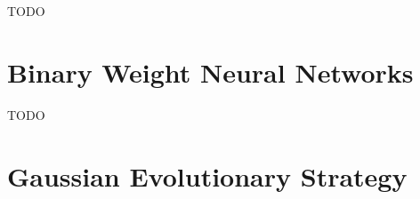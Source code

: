 \documentclass[runningheads]{llncs}
\begin{document}
TODO

\section{Binary Weight Neural Networks}
\label{sec:BWNN}


TODO

\section{Gaussian Evolutionary Strategy}
\label{sec:GES}
\end{document}
